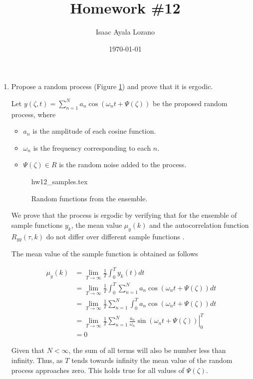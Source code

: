 \documentclass[a4paper,12pt]{article}
\title{Homework \#12}
\author{Isaac Ayala Lozano}
\date{\today}
\begin{document}
\maketitle

\begin{enumerate}
 \item Propose a random process (Figure \ref{fig: samples}) and prove that it is ergodic.

 Let $y(\zeta, t) = \sum_{n=1}^N a_n \cos (\omega_n t + \Psi(\zeta))$ be the proposed random process, where

 \begin{itemize}
  \item $a_n$ is the amplitude of each cosine function.
  \item $\omega_n$ is the frequency corresponding to each $n$.
  \item $\Psi(\zeta) \in R $ is the random noise added to the process.
 \end{itemize}

 \begin{figure}[htb!]
\centering
{hw12_samples.tex}
\caption{Random functions from the ensemble.}
\label{fig: samples}
\end{figure}

 We prove that the process is ergodic by verifying that for the ensemble of sample functions $y_k$, the mean value $\mu_y (k)$ and the autocorrelation function $R_{yy}(\tau, k)$ do not differ over different sample functions \cite{bendat2011random}.



 The mean value of the sample function is obtained as follows

 \begin{align*}
  \mu_y(k) &= \lim _{T \rightarrow \infty} \frac{1}{T} \int_0^T y_k (t) dt \\
  &= \lim _{T \rightarrow \infty} \frac{1}{T} \int_0^T \sum_{n=1}^N a_n \cos(\omega_n t + \Psi (\zeta)) dt\\
  &= \lim _{T \rightarrow \infty} \frac{1}{T}  \sum_{n=1}^N \int_0^T a_n \cos(\omega_n t + \Psi (\zeta)) dt\\
  &= \lim _{T \rightarrow \infty} \frac{1}{T}  \sum_{n=1}^N \left. \frac{a_n}{\omega_n} \sin(\omega_n t + \Psi (\zeta))  \right\rvert_{0}^{T} \\
  &= 0
 \end{align*}

 Given that $N < \infty$, the sum of all terms will also be number less than infinity.
 Thus, as $T$ tends towards infinity the mean value of the random process approaches zero.
 This holds true for all values of $\Psi(\zeta)$.




\end{enumerate}
\end{document}
